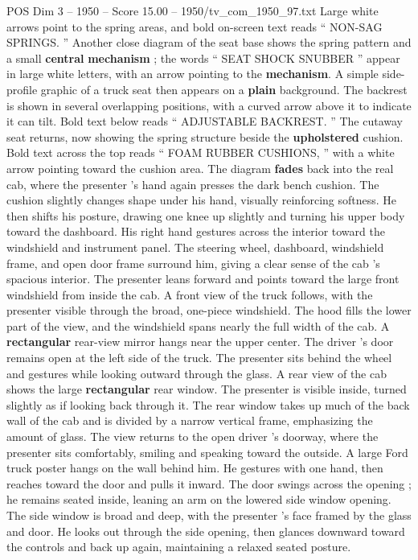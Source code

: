 \begin{textsample}{POS Dim 3 – 1950 – Score 15.00 – 1950/tv\_com\_1950\_97.txt}
Large white arrows point to the spring areas, and bold on-screen text reads “ NON-SAG SPRINGS. ” Another close diagram of the seat base shows the spring pattern and a small \textbf{central} \textbf{mechanism} ; the words “ SEAT SHOCK SNUBBER ” appear in large white letters, with an arrow pointing to the \textbf{mechanism}.
A simple side-profile graphic of a truck seat then appears on a \textbf{plain} background.
The backrest is shown in several overlapping positions, with a curved arrow above it to indicate it can tilt.
Bold text below reads “ ADJUSTABLE BACKREST. ” The cutaway seat returns, now showing the spring structure beside the \textbf{upholstered} cushion.
Bold text across the top reads “ FOAM RUBBER CUSHIONS, ” with a white arrow pointing toward the cushion area.
The diagram \textbf{fades} back into the real cab, where the presenter ’s hand again presses the dark bench cushion.
The cushion slightly changes shape under his hand, visually reinforcing softness.
He then shifts his posture, drawing one knee up slightly and turning his upper body toward the dashboard.
His right hand gestures across the interior toward the windshield and instrument panel.
The steering wheel, dashboard, windshield frame, and open door frame surround him, giving a clear sense of the cab ’s spacious interior.
The presenter leans forward and points toward the large front windshield from inside the cab.
A front view of the truck follows, with the presenter visible through the broad, one-piece windshield.
The hood fills the lower part of the view, and the windshield spans nearly the full width of the cab.
A \textbf{rectangular} rear-view mirror hangs near the upper center.
The driver ’s door remains open at the left side of the truck.
The presenter sits behind the wheel and gestures while looking outward through the glass.
A rear view of the cab shows the large \textbf{rectangular} rear window.
The presenter is visible inside, turned slightly as if looking back through it.
The rear window takes up much of the back wall of the cab and is divided by a narrow vertical frame, emphasizing the amount of glass.
The view returns to the open driver ’s doorway, where the presenter sits comfortably, smiling and speaking toward the outside.
A large Ford truck poster hangs on the wall behind him.
He gestures with one hand, then reaches toward the door and pulls it inward.
The door swings across the opening ; he remains seated inside, leaning an arm on the lowered side window opening.
The side window is broad and deep, with the presenter ’s face framed by the glass and door.
He looks out through the side opening, then glances downward toward the controls and back up again, maintaining a relaxed seated posture.

\end{textsample}

